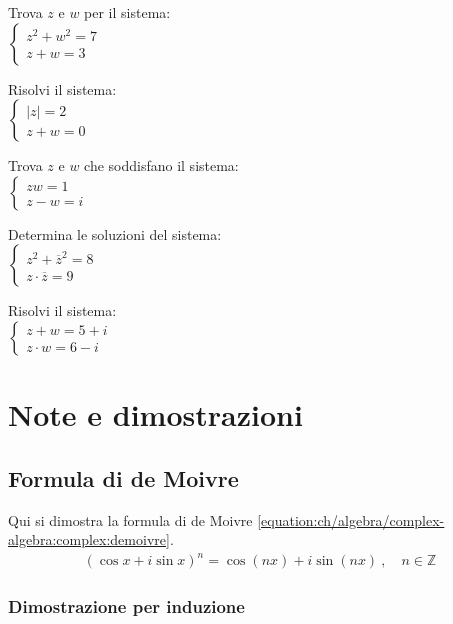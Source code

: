 \documentclass[letterpaper,10pt,italian]{jupyterBook}
\begin{document}
\sphinxAtStartPar
{} Trova \(z\) e \(w\) per il sistema:\\
\(\begin{cases} 
   z^2 + w^2 = 7 \\
   z + w = 3 
   \end{cases}\)

\sphinxAtStartPar
{} Risolvi il sistema:\\
\(\begin{cases} 
   |z| = 2 \\
   z + w = 0 
   \end{cases}\)

\sphinxAtStartPar
{} Trova \(z\) e \(w\) che soddisfano il sistema:\\
\(\begin{cases} 
   z w = 1 \\
   z - w = i 
   \end{cases}\)

\sphinxAtStartPar
{} Determina le soluzioni del sistema:\\
\(\begin{cases} 
   z^2 + \overline{z}^2 = 8 \\
   z \cdot \overline{z} = 9 
   \end{cases}\)

\sphinxAtStartPar
{} Risolvi il sistema:\\
\(\begin{cases} 
    z + w = 5 + i \\
    z \cdot w = 6 - i 
    \end{cases}\)

\sphinxstepscope


\section{Note e dimostrazioni}
\label{\detokenize{ch/algebra/complex-algebra-notes:note-e-dimostrazioni}}\label{\detokenize{ch/algebra/complex-algebra-notes:math-hs-algebra-complex-notes}}\label{\detokenize{ch/algebra/complex-algebra-notes::doc}}



\subsection{Formula di de Moivre}
\label{\detokenize{ch/algebra/complex-algebra-notes:formula-di-de-moivre}}\label{\detokenize{ch/algebra/complex-algebra-notes:math-hs-algebra-complex-notes-demoivre}}
\sphinxAtStartPar
Qui si dimostra la formula di de Moivre \eqref{equation:ch/algebra/complex-algebra:complex:demoivre}.
\begin{equation*}
\begin{split}(\cos x + i \sin x)^n = \cos(nx) + i \sin(nx) \ , \quad n \in \mathbb{Z}\end{split}
\end{equation*}\subsubsection*{Dimostrazione per induzione}
\end{document}
